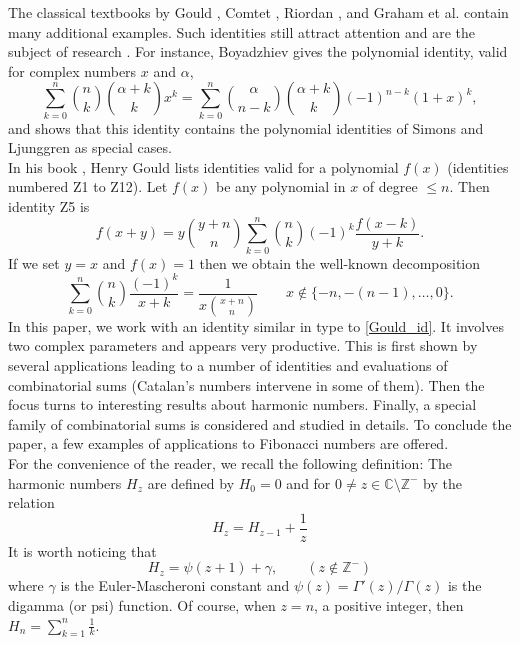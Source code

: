\documentclass[11pt,reqno]{amsart}
\theoremstyle{plain}
\numberwithin{equation}{section}
\begin{document}
The classical textbooks by Gould \cite{Gould}, Comtet \cite{Comtet}, Riordan \cite{Riordan}, 
and Graham et al. \cite{Graham} contain many additional examples. Such identities still attract attention and are 
the subject of research \cite{Adegoke26,Adegoke,Alzer,Munarini,Boyadzhiev10}. 
For instance, Boyadzhiev \cite[Proposition 2]{Boyadzhiev10} gives the polynomial identity, valid for complex numbers $x$ and $\alpha$,
\begin{equation*}
\sum_{k=0}^n \binom{n}{k} \binom{\alpha+k}{k} x^k = \sum_{k=0}^n \binom{\alpha}{n-k} \binom{\alpha+k}{k} (-1)^{n-k} (1+x)^k,
\end{equation*}
and shows that this identity contains the polynomial identities of Simons and Ljunggren as special cases. \\

In his book \cite{Gould}, Henry Gould lists identities valid for a polynomial $f(x)$ (identities numbered Z1 to Z12). 
Let $f(x)$ be any polynomial in $x$ of degree $\leq n$. Then identity Z5 is
\begin{equation}\label{Gould_id}
f(x+y) = y \binom{y+n}{n} \sum_{k=0}^n \binom{n}{k} (-1)^k \frac{f(x-k)}{y+k}.
\end{equation}
If we set $y=x$ and $f(x)=1$ then
we obtain the well-known decomposition
\begin{equation}\label{partial}
\sum_{k=0}^n \binom{n}{k} \frac{(-1)^k}{x+k} = \frac{1}{x\binom{x+n}{n}} \qquad x\notin \{-n,-(n-1),\ldots,0\}.
\end{equation}
In this paper, we work with an identity similar in type to \eqref{Gould_id}. It involves two complex parameters and appears very productive. This is first shown by several applications leading to a number of identities and evaluations of combinatorial sums (Catalan's numbers intervene in some of them). Then the focus turns to interesting results about harmonic numbers. Finally, a special family of combinatorial sums is considered and studied in details. To conclude the paper, a few examples of applications to Fibonacci numbers are offered.\\[0.3cm]
For the convenience of the reader, we recall the following definition: 
The harmonic numbers $H_z$ are defined by $H_0=0$ and for $0\ne z\in\mathbb C\setminus\mathbb Z^{-}$ by the relation
\begin{equation*}
H_z = H_{z - 1} + \frac{1}{z}
\end{equation*}
It is worth noticing that
\begin{equation}\label{Har_psi}
H_z = \psi(z + 1) + \gamma,\qquad (z\notin \mathbb{Z}^-)
\end{equation}
where $\gamma$ is the Euler-Mascheroni constant and $\psi(z)=\Gamma'(z)/\Gamma(z)$ is the digamma (or psi) function. 
Of course, when $z=n$, a positive integer, then $H_n=\sum_{k=1}^n \frac{1}{k}$.
\end{document}
